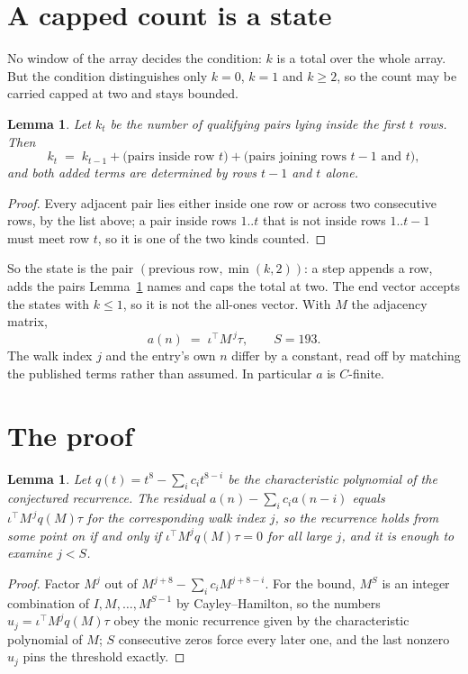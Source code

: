 \documentclass[11pt,a4paper]{article}
\theoremstyle{plain}
\newtheorem{lemma}[theorem]{Lemma}
\theoremstyle{definition}
\begin{document}
\section{A capped count is a state}

No window of the array decides the condition: $k$ is a total over the whole array. But the
condition distinguishes only $k=0$, $k=1$ and $k\ge2$, so the count may be carried capped at
two and stays bounded.

\begin{lemma}\label{lem:cap}
Let $k_t$ be the number of qualifying pairs lying inside the first $t$ rows. Then
\[
k_{t}\;=\;k_{t-1}+\bigl(\text{pairs inside row } t\bigr)
+\bigl(\text{pairs joining rows } t-1 \text{ and } t\bigr),
\]
and both added terms are determined by rows $t-1$ and $t$ alone.
\end{lemma}

\begin{proof}
Every adjacent pair lies either inside one row or across two consecutive rows, by the list
above; a pair inside rows $1..t$ that is not inside rows $1..t-1$ must meet row $t$, so it is
one of the two kinds counted.
\end{proof}

So the state is the pair $(\text{previous row},\min(k,2))$: a step appends a row, adds the
pairs Lemma~\ref{lem:cap} names and caps the total at two. The end vector accepts the states
with $k\le1$, so it is not the all-ones vector. With $M$ the adjacency matrix,
\[
a(n)\;=\;\iota^{\!\top}M^{\,j}\tau ,\qquad S=193.
\]
The walk index $j$ and the entry's own $n$ differ by a constant, read off by matching the
published terms rather than assumed. In particular $a$ is $C$-finite.

\section{The proof}

\begin{lemma}\label{lem:crit}
Let $q(t)=t^{8}-\sum_i c_it^{8-i}$ be the characteristic polynomial of the
conjectured recurrence. The residual $a(n)-\sum_ic_ia(n-i)$ equals
$\iota^{\!\top}M^{\,j}q(M)\tau$ for the corresponding walk index $j$, so the recurrence
holds from some point on if and only if $\iota^{\!\top}M^{j}q(M)\tau=0$ for all large $j$,
and it is enough to examine $j<S$.
\end{lemma}

\begin{proof}
Factor $M^{j}$ out of $M^{j+8}-\sum_ic_iM^{j+8-i}$. For the bound, $M^{S}$
is an integer combination of $I,M,\dots,M^{S-1}$ by Cayley--Hamilton, so the numbers
$u_j=\iota^{\!\top}M^{j}q(M)\tau$ obey the monic recurrence given by the characteristic
polynomial of $M$; $S$ consecutive zeros force every later one, and the last nonzero $u_j$
pins the threshold exactly.
\end{proof}
\end{document}
